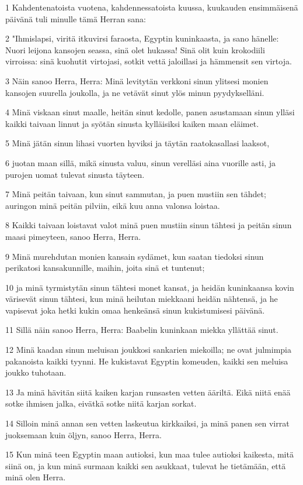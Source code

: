 \par 1 Kahdentenatoista vuotena, kahdennessatoista kuussa, kuukauden ensimmäisenä päivänä tuli minulle tämä Herran sana:
\par 2 "Ihmislapsi, viritä itkuvirsi faraosta, Egyptin kuninkaasta, ja sano hänelle: Nuori leijona kansojen seassa, sinä olet hukassa! Sinä olit kuin krokodiili virroissa: sinä kuohutit virtojasi, sotkit vettä jaloillasi ja hämmensit sen virtoja.
\par 3 Näin sanoo Herra, Herra: Minä levitytän verkkoni sinun ylitsesi monien kansojen suurella joukolla, ja ne vetävät sinut ylös minun pyydykselläni.
\par 4 Minä viskaan sinut maalle, heitän sinut kedolle, panen asustamaan sinun ylläsi kaikki taivaan linnut ja syötän sinusta kylläisiksi kaiken maan eläimet.
\par 5 Minä jätän sinun lihasi vuorten hyviksi ja täytän raatokasallasi laaksot,
\par 6 juotan maan sillä, mikä sinusta valuu, sinun verelläsi aina vuorille asti, ja purojen uomat tulevat sinusta täyteen.
\par 7 Minä peitän taivaan, kun sinut sammutan, ja puen mustiin sen tähdet; auringon minä peitän pilviin, eikä kuu anna valonsa loistaa.
\par 8 Kaikki taivaan loistavat valot minä puen mustiin sinun tähtesi ja peitän sinun maasi pimeyteen, sanoo Herra, Herra.
\par 9 Minä murehdutan monien kansain sydämet, kun saatan tiedoksi sinun perikatosi kansakunnille, maihin, joita sinä et tuntenut;
\par 10 ja minä tyrmistytän sinun tähtesi monet kansat, ja heidän kuninkaansa kovin värisevät sinun tähtesi, kun minä heilutan miekkaani heidän nähtensä, ja he vapisevat joka hetki kukin omaa henkeänsä sinun kukistumisesi päivänä.
\par 11 Sillä näin sanoo Herra, Herra: Baabelin kuninkaan miekka yllättää sinut.
\par 12 Minä kaadan sinun meluisan joukkosi sankarien miekoilla; ne ovat julmimpia pakanoista kaikki tyynni. He kukistavat Egyptin komeuden, kaikki sen meluisa joukko tuhotaan.
\par 13 Ja minä hävitän siitä kaiken karjan runsasten vetten ääriltä. Eikä niitä enää sotke ihmisen jalka, eivätkä sotke niitä karjan sorkat.
\par 14 Silloin minä annan sen vetten laskeutua kirkkaiksi, ja minä panen sen virrat juoksemaan kuin öljyn, sanoo Herra, Herra.
\par 15 Kun minä teen Egyptin maan autioksi, kun maa tulee autioksi kaikesta, mitä siinä on, ja kun minä surmaan kaikki sen asukkaat, tulevat he tietämään, että minä olen Herra.
